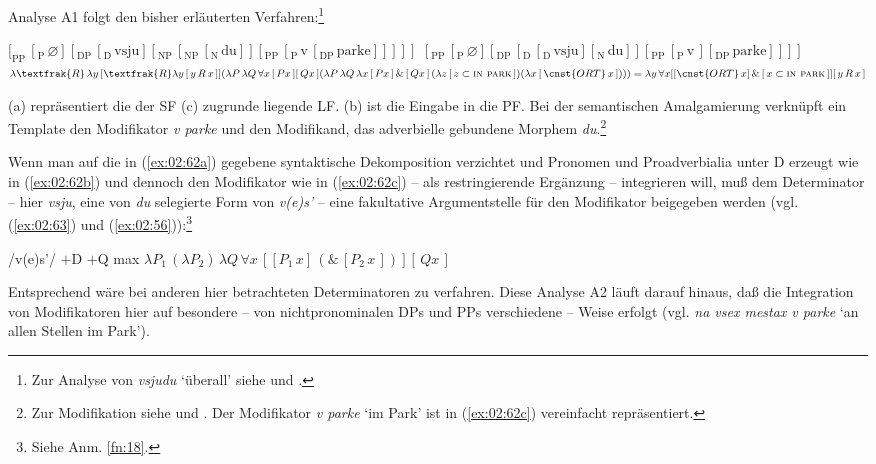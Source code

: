 \documentclass[output=paper, colorlinks, citecolor=brown, booklanguage=german]{langscibook}
\begin{document}
\begin{otherlanguage}{german}
Analyse A1 folgt den bisher erläuterten Verfahren:\footnote{Zur Analyse von \textit{vsjudu} `überall' siehe \citet[102]{Preobrazenskij1958} und \citet[364]{Vasmer1964}.}

\ea\label{ex:02:62}
    \ea\label{ex:02:62a} $[_\textrm{PP}\, [_\textrm{P}\, \varnothing] [_\textrm{DP}\, [_\textrm{D}\, \textrm{vsju}] [_\textrm{NP}\, [_\textrm{NP}\, [_\textrm{N}\, \textrm{du}]] [_\textrm{PP}\, [_\textrm{P}\, \textrm{v}\, [_\textrm{DP}\, \textrm{parke}]]]]]$
    \ex\label{ex:02:62b} $[_\textrm{PP}\, [_\textrm{P}\, \varnothing] [_\textrm{DP}\, [_\textrm{D}\, [_\textrm{D}\, \textrm{vsju} ][_\textrm{N}\, \textrm{du}]] [_\textrm{PP}\, [_\textrm{P}\, \textrm{v}\,] [_\textrm{DP}\, \textrm{parke}]]]]$
    \ex\label{ex:02:62c} $\lambda \textfrak{R}\, \lambda y\, [\textfrak{R} \lambda y\, [\, y\, R\, x\,]] (\lambda P\, \lambda Q\, \forall x\, [\, P x \,][\, Q x \,]\linebreak
    (\lambda P\, \lambda Q\, \lambda x\, [\, P x \,]\, \& \,[\, Q x \,]\, (\lambda z\, [\, z \subset \textsc{in park}\, ]) 
    (\lambda x\, [\, \cnst{ORT}\, x \,] )))\linebreak
    = \lambda y\, \forall x [[ \cnst{ORT}\, x ]\, \& \,[\, x \subset \textsc{in park} \,]][\, y\, R\, x \,]$
    \z
\z 

\noindent (a) repräsentiert die der SF (c) zugrunde liegende LF. (b) ist die Eingabe in die PF. Bei der semantischen Amalgamierung verknüpft ein Template den Modifikator \textit{v parke} und den Modifikand, das adverbielle gebundene Morphem \textit{du}.\footnote{Zur Modifikation siehe \citet{Zimmermann1992} und \citet{Wunderlich1997b}. Der Modifikator \textit{v parke} `im Park' ist in (\ref{ex:02:62c}) vereinfacht repräsentiert.}

Wenn man auf die in (\ref{ex:02:62a}) gegebene syntaktische Dekomposition verzichtet und Pronomen und Proadverbialia unter D erzeugt wie in (\ref{ex:02:62b}) und dennoch den Modifikator wie in (\ref{ex:02:62c}) -- als restringierende Ergänzung -- integrieren will, muß dem Determinator -- hier \textit{vsju}, eine von \textit{du} selegierte Form von \textit{v(e)s'} -- eine fakultative Argumentstelle für den Modifikator beigegeben werden (vgl. (\ref{ex:02:63}) und (\ref{ex:02:56})):\footnote{Siehe Anm. \ref{fn:18}.}

\ea\label{ex:02:63}
    \ea /v(e)s'/
    \ex $+$D $+$Q \textalpha max
    \ex $\lambda P_1\, (\lambda P_2)\, \lambda Q\, \forall x\, [[P_1\, x]\, (\&\, [P_2\, x\,])] [\, Q x \,]$
    \z
\z 

\noindent Entsprechend wäre bei anderen hier betrachteten Determinatoren zu verfahren. Diese Analyse A2 läuft darauf hinaus, daß die Integration von Modifikatoren hier auf besondere -- von nichtpronominalen DPs und PPs verschiedene -- Weise erfolgt (vgl. \textit{na vsex mestax v parke} `an allen Stellen im Park').


\end{otherlanguage}
\end{document}
